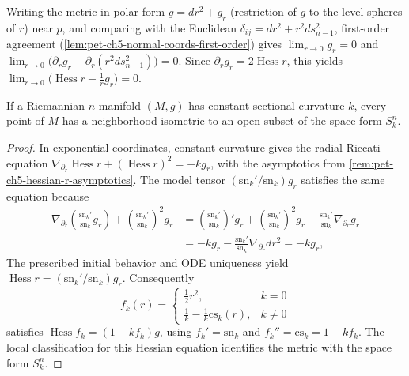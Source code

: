 \begin{remark}
  \label{rem:pet-ch5-hessian-r-asymptotics}
  Writing the metric in polar form $g=dr^2+g_r$ (restriction of $g$ to the level
  spheres of $r$) near $p$, and comparing with the Euclidean
  $\delta_{ij}=dr^2+r^2ds_{n-1}^2$, first-order agreement
  (\cref{lem:pet-ch5-normal-coords-first-order}) gives $\lim_{r\to0}g_r=0$ and
  $\lim_{r\to0}\big(\partial_rg_r-\partial_r(r^2ds_{n-1}^2)\big)=0$. Since
  $\partial_rg_r=2\operatorname{Hess}r$, this yields
  $\lim_{r\to0}\big(\operatorname{Hess}r-\tfrac1rg_r\big)=0$.
\end{remark}

\begin{theorem}
  \label{thm:pet-ch5-riemann-constant-curvature-local}
  If a Riemannian $n$-manifold $(M,g)$ has constant sectional curvature $k$, every
  point of $M$ has a neighborhood isometric to an open subset of the space form
  $S^n_k$.
\end{theorem}
\begin{proof}
  \sketch
  In exponential coordinates, constant curvature gives the radial Riccati equation
  $\nabla_{\partial_r}\operatorname{Hess}r+(\operatorname{Hess}r)^2=-kg_r$, with
  the asymptotics from \cref{rem:pet-ch5-hessian-r-asymptotics}.  The model
  tensor $(\mathrm{sn}_k'/\mathrm{sn}_k)g_r$ satisfies the same equation because
  \begin{align*}
    \nabla_{\partial_r}\!\left(\frac{\mathrm{sn}_k'}{\mathrm{sn}_k}g_r\right)
    +\left(\frac{\mathrm{sn}_k'}{\mathrm{sn}_k}\right)^2g_r
    &=\left(\frac{\mathrm{sn}_k'}{\mathrm{sn}_k}\right)'g_r
    +\left(\frac{\mathrm{sn}_k'}{\mathrm{sn}_k}\right)^2g_r
    +\frac{\mathrm{sn}_k'}{\mathrm{sn}_k}\nabla_{\partial_r}g_r\\
    &=-kg_r-\frac{\mathrm{sn}_k'}{\mathrm{sn}_k}\nabla_{\partial_r}dr^2=-kg_r,
  \end{align*}
  The prescribed initial behavior and ODE uniqueness yield
  $\operatorname{Hess}r=(\mathrm{sn}_k'/\mathrm{sn}_k)g_r$.  Consequently
  \[
    f_k(r)=\begin{cases}\tfrac12r^2,&k=0\\ \tfrac1k-\tfrac1k\mathrm{cs}_k(r),&k\ne0\end{cases}
  \]
  satisfies $\operatorname{Hess}f_k=(1-kf_k)g$, using
  $f_k'=\mathrm{sn}_k$ and $f_k''=\mathrm{cs}_k=1-kf_k$.  The local classification
  for this Hessian equation identifies the metric with the space form $S_k^n$.
\end{proof}

